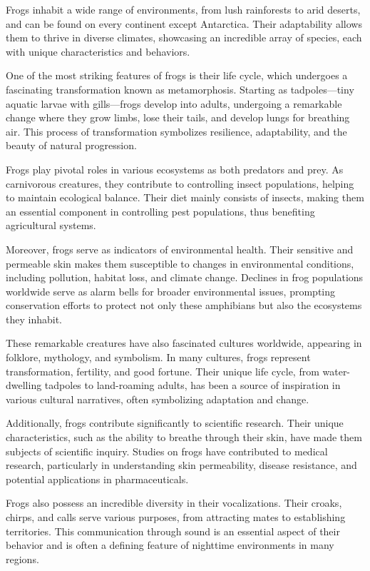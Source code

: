 \documentclass[twocolumn, 9pt]{extarticle}
\begin{document}
Frogs inhabit a wide range of environments, from lush rainforests to arid deserts, and can be found on every continent except Antarctica. Their adaptability allows them to thrive in diverse climates, showcasing an incredible array of species, each with unique characteristics and behaviors.

One of the most striking features of frogs is their life cycle, which undergoes a fascinating transformation known as metamorphosis. Starting as tadpoles—tiny aquatic larvae with gills—frogs develop into adults, undergoing a remarkable change where they grow limbs, lose their tails, and develop lungs for breathing air. This process of transformation symbolizes resilience, adaptability, and the beauty of natural progression.

Frogs play pivotal roles in various ecosystems as both predators and prey. As carnivorous creatures, they contribute to controlling insect populations, helping to maintain ecological balance. Their diet mainly consists of insects, making them an essential component in controlling pest populations, thus benefiting agricultural systems.

Moreover, frogs serve as indicators of environmental health. Their sensitive and permeable skin makes them susceptible to changes in environmental conditions, including pollution, habitat loss, and climate change. Declines in frog populations worldwide serve as alarm bells for broader environmental issues, prompting conservation efforts to protect not only these amphibians but also the ecosystems they inhabit.

These remarkable creatures have also fascinated cultures worldwide, appearing in folklore, mythology, and symbolism. In many cultures, frogs represent transformation, fertility, and good fortune. Their unique life cycle, from water-dwelling tadpoles to land-roaming adults, has been a source of inspiration in various cultural narratives, often symbolizing adaptation and change.

Additionally, frogs contribute significantly to scientific research. Their unique characteristics, such as the ability to breathe through their skin, have made them subjects of scientific inquiry. Studies on frogs have contributed to medical research, particularly in understanding skin permeability, disease resistance, and potential applications in pharmaceuticals.

Frogs also possess an incredible diversity in their vocalizations. Their croaks, chirps, and calls serve various purposes, from attracting mates to establishing territories. This communication through sound is an essential aspect of their behavior and is often a defining feature of nighttime environments in many regions.
\end{document}
